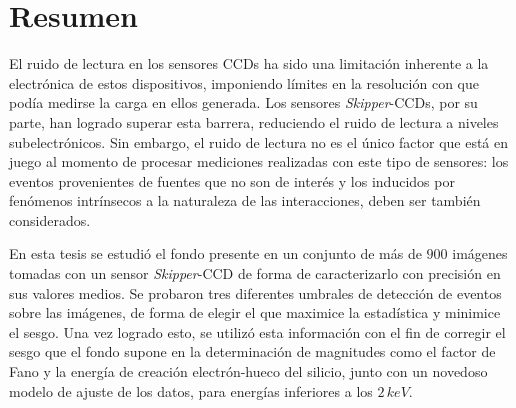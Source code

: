 \newpage
\chapter*{Resumen}
\thispagestyle{empty}
\noindent El ruido de lectura en los sensores CCDs ha sido una limitación inherente a la electrónica de estos dispositivos, imponiendo límites en la resolución con que podía medirse la carga en ellos generada. Los sensores \textit{Skipper}-CCDs, por su parte, han logrado superar esta barrera, reduciendo el ruido de lectura a niveles subelectrónicos. Sin embargo, el ruido de lectura no es el único factor que está en juego al momento de procesar mediciones realizadas con este tipo de sensores: los eventos provenientes de fuentes que no son de interés y los inducidos por fenómenos intrínsecos a la naturaleza de las interacciones, deben ser también considerados.


En esta tesis se estudió el fondo presente en un conjunto de más de $900$ imágenes tomadas con un sensor \textit{Skipper}-CCD de forma de caracterizarlo con precisión en sus valores medios. Se probaron tres diferentes umbrales de detección de eventos sobre las imágenes, de forma de elegir el que maximice la estadística y minimice el sesgo. Una vez logrado esto, se utilizó esta información con el fin de corregir el sesgo que el fondo supone en la determinación de magnitudes como el factor de Fano y la energía de creación electrón-hueco del silicio, junto con un novedoso modelo de ajuste de los datos, para energías inferiores a los $2\,\si{keV}$.



